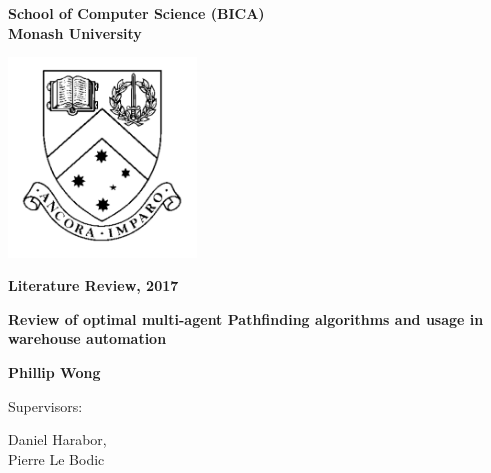 \documentclass[a4paper,11pt]{article}
\begin{document}
	
\thispagestyle{empty} %
\renewcommand{\thepage}{\roman{page}}

\begin{spacing}{1.5}
	\begin{center}
		{\Large \bfseries
			School of Computer Science (BICA) \\
			Monash University}
		
		
		\vspace*{30mm}
		
		\includegraphics[width=5cm]{graphics/MonashCrest.pdf}
		
		\vspace*{15mm}
		
		{\large \bfseries
			Literature Review, 2017
		}
		
		\vspace*{10mm}
		
		{\LARGE \bfseries
			Review of optimal multi-agent Pathfinding algorithms and usage in warehouse automation
		}
		
		\vspace*{20mm}
		
		{\large \bfseries
			Phillip Wong
			
			\vspace*{20mm}
			
			
			Supervisors: \parbox[t]{50mm}{Daniel Harabor,\\Pierre Le Bodic}
		}
		
	\end{center}
\end{spacing}

\newpage

\tableofcontents

\newpage
\setcounter{page}{1}
\renewcommand{\thepage}{\arabic{page}}
\end{document}
